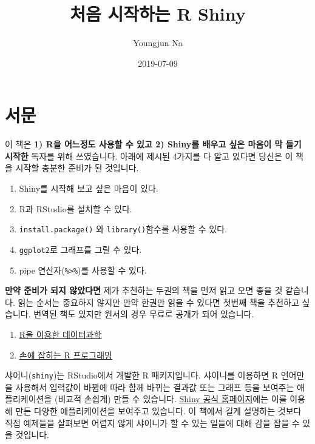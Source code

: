 \documentclass[]{book}
\title{처음 시작하는 R Shiny}
\author{Youngjun Na}
\date{2019-07-09}
\providecommand{\tightlist}{%
  \setlength{\itemsep}{0pt}\setlength{\parskip}{0pt}}
\begin{document}
\maketitle

{
\setcounter{tocdepth}{1}
\tableofcontents
}
\chapter{서문}\label{intro}

이 책은 \textbf{1) R을 어느정도 사용할 수 있고 2) Shiny를 배우고 싶은
마음이 막 들기 시작한} 독자를 위해 쓰였습니다. 아래에 제시된 4가지를 다
알고 있다면 당신은 이 책을 시작할 충분한 준비가 된 것입니다.

\begin{enumerate}
\def\labelenumi{\arabic{enumi}.}
\setcounter{enumi}{-1}
\tightlist
\item
  Shiny를 시작해 보고 싶은 마음이 있다.
\item
  R과 RStudio를 설치할 수 있다.
\item
  \texttt{install.package()} 와 \texttt{library()}함수를 사용할 수 있다.
\item
  \texttt{ggplot2}로 그래프를 그릴 수 있다.
\item
  pipe 연산자(\texttt{\%\textgreater{}\%})를 사용할 수 있다.
\end{enumerate}

\textbf{만약 준비가 되지 않았다면} 제가 추천하는 두권의 책을 먼저 읽고
오면 좋을 것 같습니다. 읽는 순서는 중요하지 않지만 만약 한권만 읽을 수
있다면 첫번째 책을 추천하고 싶습니다. 번역된 책도 있지만 원서의 경우
무료로 공개가 되어 있습니다.

\begin{enumerate}
\def\labelenumi{\arabic{enumi}.}
\tightlist
\item
  \href{https://r4ds.had.co.nz/}{R을 이용한 데이터과학}
\item
  \href{https://rstudio-education.github.io/hopr/}{손에 잡히는 R
  프로그래밍}
\end{enumerate}

샤이니(\texttt{shiny})는 RStudio에서 개발한 R 패키지입니다. 샤이니를
이용하면 R 언어만을 사용해서 입력값이 바뀜에 따라 함께 바뀌는 결과값
또는 그래프 등을 보여주는 애플리케이션을 (비교적 손쉽게) 만들 수
있습니다. \href{https://shiny.rstudio.com/gallery/}{Shiny 공식
홈페이지}에는 이를 이용해 만든 다양한 애플리케이션을 보여주고 있습니다.
이 책에서 길게 설명하는 것보다 직접 예제들을 살펴보면 어렵지 않게
샤이니가 할 수 있는 일들에 대해 감을 잡을 수 있을 것입니다.
\end{document}
